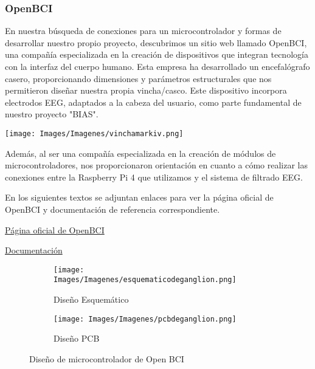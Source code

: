 \documentclass{article}
\begin{document}
\subsubsection{OpenBCI}

En nuestra búsqueda de conexiones para un microcontrolador y formas de desarrollar nuestro propio proyecto, descubrimos un sitio web llamado OpenBCI, una compañía especializada en la creación de dispositivos que integran tecnología con la interfaz del cuerpo humano. Esta empresa ha desarrollado un encefalógrafo casero, proporcionando dimensiones y parámetros estructurales que nos permitieron diseñar nuestra propia vincha/casco. Este dispositivo incorpora electrodos EEG, adaptados a la cabeza del usuario, como parte fundamental de nuestro proyecto "BIAS".

\begin{center}
    \texttt{[image: Images/Imagenes/vinchamarkiv.png]}\\
\end{center}

Además, al ser una compañía especializada en la creación de módulos de microcontroladores, nos proporcionaron orientación en cuanto a cómo realizar las conexiones entre la Raspberry Pi 4 que utilizamos y el sistema de filtrado EEG.

En los siguientes textos se adjuntan enlaces para ver la página oficial de OpenBCI y documentación de referencia correspondiente.

\begin{center}
    \href{https://openbci.com/}{Página oficial de OpenBCI}

    
    \href{https://docs.openbci.com/}{Documentación}

    
\end{center}

\begin{figure}[h!]
\centering

\begin{subfigure}[b]{0.45\linewidth}
\texttt{[image: Images/Imagenes/esquematicodeganglion.png]}
\caption{Diseño Esquemático}
\label{fig:westminster_lateral}
\end{subfigure}

\begin{subfigure}[b]{0.45\linewidth}
\texttt{[image: Images/Imagenes/pcbdeganglion.png]}
\caption{Diseño PCB}
\label{fig:westminster_aerea}

\end{subfigure}
\caption{Diseño de microcontrolador de Open BCI}
\label{fig:westminster}
\end{figure}
\end{document}
